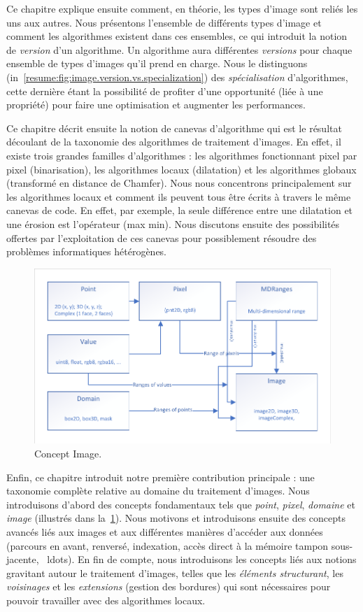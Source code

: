 Ce chapitre explique ensuite comment, en théorie, les types d'image sont reliés les uns aux autres. Nous présentons
l'ensemble de différents types d'image et comment les algorithmes existent dans ces ensembles, ce qui introduit la
notion de \emph{version} d'un algorithme. Un algorithme aura différentes \emph{versions} pour chaque ensemble de types
d'images qu'il prend en charge. Nous le distinguons (in~\cref{resume:fig:image.version.vs.specialization}) des
\emph{spécialisation} d'algorithmes, cette dernière étant la possibilité de profiter d'une opportunité (liée à une
propriété) pour faire une optimisation et augmenter les performances.

Ce chapitre décrit ensuite la notion de canevas d'algorithme qui est le résultat découlant de la taxonomie des
algorithmes de traitement d'images. En effet, il existe trois grandes familles d'algorithmes : les algorithmes
fonctionnant pixel par pixel (binarisation), les algorithmes locaux (dilatation) et les algorithmes globaux (transformé
en distance de Chamfer). Nous nous concentrons principalement sur les algorithmes locaux et comment ils peuvent tous
être écrits à travers le même canevas de code. En effet, par exemple, la seule différence entre une dilatation et une
érosion est l'opérateur (max \vs min). Nous discutons ensuite des possibilités offertes par l'exploitation de ces
canevas pour possiblement résoudre des problèmes informatiques hétérogènes.

\begin{figure}[htbp]
  \centering
  \includegraphics[width=.8\linewidth]{../figures/concepts/image}
  \caption[]{Concept Image.}
  \label{resume:fig:concept.image}
\end{figure}

Enfin, ce chapitre introduit notre première contribution principale : une taxonomie complète relative au domaine du
traitement d'images. Nous introduisons d'abord des concepts fondamentaux tels que \emph{point}, \emph{pixel},
\emph{domaine} et \emph{image} (illustrés dans la~\cref{resume:fig:concept.image}). Nous motivons et introduisons
ensuite des concepts avancés liés aux images et aux différentes manières d'accéder aux données (parcours en avant,
renversé, indexation, accès direct à la mémoire tampon sous-jacente, \ ldots). En fin de compte, nous introduisons les
concepts liés aux notions gravitant autour le traitement d'images, telles que les \emph{éléments structurant}, les
\emph{voisinages} et les \emph{extensions} (gestion des bordures) qui sont nécessaires pour pouvoir travailler avec des
algorithmes locaux.

